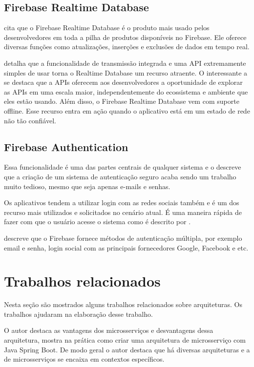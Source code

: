 \subsection{Firebase Realtime Database}


\cite{Yahiaoui2017} cita que o Firebase Realtime Database é o produto mais usado pelos desenvolvedores em toda a pilha de produtos disponíveis no Firebase. Ele oferece diversas funções como atualizações, inserções e exclusões de dados em tempo real.

\cite{Yahiaoui2017} detalha que a funcionalidade de transmissão integrada e uma API extremamente simples de usar torna o Realtime Database um recurso atraente. O interessante a se destaca que a APIs oferecem aos desenvolvedores a oportunidade de explorar as APIs em uma escala maior, independentemente do ecossistema e ambiente que eles estão usando. Além disso, o Firebase Realtime Database vem com suporte offline. Esse recurso entra em ação quando o aplicativo está em um estado de rede não tão confiável.


\subsection{Firebase Authentication}

Essa funcionalidade é uma das partes centrais de qualquer sistema e o \cite{Yahiaoui2017} descreve que a criação de um sistema de autenticação seguro acaba sendo um trabalho muito tedioso, mesmo que seja apenas e-mails e senhas.

Os aplicativos tendem a utilizar login com as redes sociais também e é um dos recurso mais utilizados e solicitados no cenário atual. É uma maneira rápida de fazer com que o usuário acesse o sistema como é descrito por \cite{Yahiaoui2017}.

\cite{Yahiaoui2017} descreve que o Firebase fornece métodos de autenticação múltipla, por exemplo email e senha, login social com as principais fornecedores Google, Facebook e etc.

\section{Trabalhos relacionados}

Nesta seção são mostrados alguns trabalhos relacionados sobre arquiteturas. Os trabalhos ajudaram na elaboração desse trabalho.

O autor \cite{Moreira2015} destaca as vantagens dos microsserviços e desvantagens dessa arquitetura, mostra na prática como criar uma arquitetura de microsserviço com Java Spring Boot. De modo geral o autor destaca que há diversas arquiteturas e a de microsserviços se encaixa em contextos específicos.

